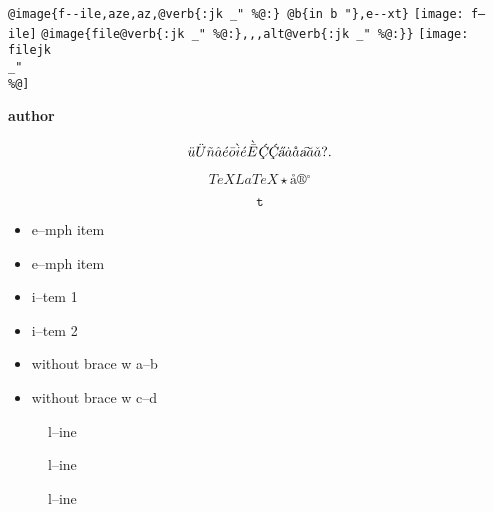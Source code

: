 \documentclass{book}
\renewcommand{\includegraphics}[1]{\fbox{FIG #1}}
\begin{document}
\begin{titlepage}
\texttt{@image\{f{-}{-}ile,aze,az,@verb\{:jk \_" \%@:\} @b\{in b "\},e{-}{-}xt\}} \texttt{[image: f--ile]}
\texttt{@image\{file@verb\{:jk \_" \%@:\},,,alt@verb\{:jk \_" \%@:\}\}} \texttt{[image: filejk \\\_" \\\%@]}


{\bfseries author}%

$$
\ddot{u} \ddot{U} \tilde{n} \hat{a} \acute{e} \bar{o} \grave{i} \acute{e} \grave{\bar{E}}
\textsl{\c{\'{C}}} \textsl{\c{\'{C}}} \textsl{\H{a}} \dot{a} \mathring{a} \textsl{\t{a}}
\breve{a} \check{a}
 ? .
$$

$$
TeX LaTeX \star{} \mathord{\text{\aa{}}} \circledR{} ^{\circ{}} 
$$

$$
\mathtt{t} 
$$

\begin{itemize}[label=\emph{}]
\item e--mph item
\end{itemize}

\begin{itemize}[label=\emph{} after emph]
\item e--mph item
\end{itemize}

\begin{itemize}[label=\textbullet{} a--n itemize line]
\item i--tem 1
\item i--tem 2
\end{itemize}

\begin{itemize}[label={}]
\item without brace w a--b
\item without brace w c--d
\end{itemize}

\begin{description}
\item[{\parbox[b]{\linewidth}{%
a}}]
l--ine
\end{description}

\begin{description}
\item[{\parbox[b]{\linewidth}{%
a--missing style formatting}}]
l--ine
\end{description}

\begin{description}
\item[{\parbox[b]{\linewidth}{%
a\\
\index[fn]{a@\texttt{a}}%
\index[cp]{index entry between item and itemx}%
b
\index[fn]{b@\texttt{b}}%
}}]
l--ine
\end{description}


\end{titlepage}
\end{document}
